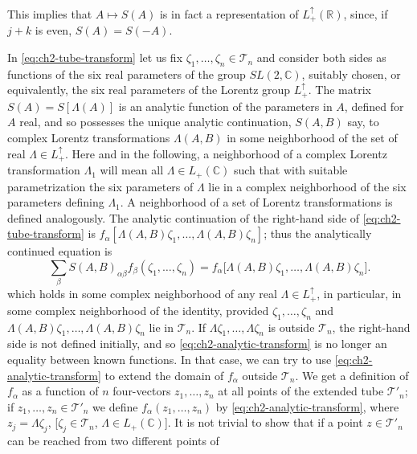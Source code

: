 This implies that $A\mapsto S(A)$ is in fact a representation of
$L^{\uparrow}_{+}(\mathbb R)$, since, if $j+k$ is even, $S(A)=S(-A)$.

In \eqref{eq:ch2-tube-transform} let us fix $\zeta_1,\ldots,\zeta_n\in\mathcal{T}_{n}$ and
consider both sides as functions of the six real parameters of the group
$SL(2,\mathbb C)$, suitably chosen, or equivalently, the six real parameters
of the Lorentz group $L^{\uparrow}_{+}$.  The matrix
$S(A)=S[\Lambda(A)]$ is an analytic function of the parameters in $A$, defined
for $A$ real, and so possesses the unique analytic continuation, $S(A,B)$ say,
to complex Lorentz transformations $\Lambda(A,B)$ in some neighborhood of the
set of real $\Lambda\in L^{\uparrow}_{+}$.  Here and in the following, a
neighborhood of a complex Lorentz transformation $\Lambda_1$ will mean all
$\Lambda\in L_{+}(\mathbb C)$ such that with suitable parametrization the six
parameters of $\Lambda$ lie in a complex neighborhood of the six parameters
defining $\Lambda_1$.  A neighborhood of a set of Lorentz transformations is
defined analogously.  The analytic continuation of the right-hand side of
\eqref{eq:ch2-tube-transform} is
$f_{\alpha}[\Lambda(A,B)\zeta_1,\ldots,\Lambda(A,B)\zeta_n]$; thus the
analytically continued equation is
\begin{equation}
  \sum_{\beta}S(A,B)_{\alpha\beta}
  f_{\beta}(\zeta_1,\ldots,\zeta_n)
  =f_{\alpha}\bigl[\Lambda(A,B)\zeta_1,\ldots,
    \Lambda(A,B)\zeta_n\bigr] .
  \tag{2-85}\label{eq:ch2-analytic-transform}
\end{equation}
which holds in some complex neighborhood of any real $\Lambda\in
L^{\uparrow}_{+}$, in particular, in some complex neighborhood of the
identity, provided $\zeta_1,\ldots,\zeta_n$ and
$\Lambda(A,B)\zeta_1,\ldots,\Lambda(A,B)\zeta_n$ lie in $\mathcal{T}_{n}$.
If $\Lambda\zeta_1,\ldots,\Lambda\zeta_n$ is outside $\mathcal{T}_{n}$, the
right-hand side is not defined initially, and so \eqref{eq:ch2-analytic-transform} is no longer an
equality between known functions.  In that case, we can try to use \eqref{eq:ch2-analytic-transform} to
extend the domain of $f_{\alpha}$ outside $\mathcal{T}_{n}$.  We get a
definition of $f_{\alpha}$ as a function of $n$ four-vectors
$z_1,\ldots,z_n$ at all points of the extended tube $\mathcal{T}'_{n}$; if
$z_1,\ldots,z_n\in\mathcal{T}'_{n}$ we define $f_{\alpha}(z_1,\ldots,z_n)$ by
\eqref{eq:ch2-analytic-transform}, where $z_j=\Lambda\zeta_j$, [$\zeta_j\in\mathcal{T}_{n}$,
$\Lambda\in L_{+}(\mathbb C)$].  It is not trivial to show that if a point
$z\in\mathcal{T}'_{n}$ can be reached from two different points of
